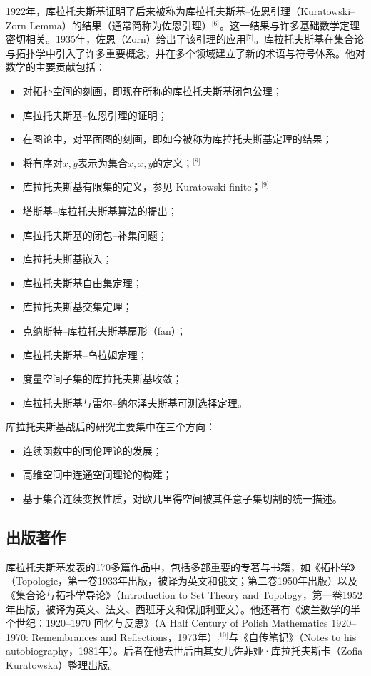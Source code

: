 1922年，库拉托夫斯基证明了后来被称为库拉托夫斯基–佐恩引理（Kuratowski–Zorn Lemma）的结果（通常简称为佐恩引理）\(^\text{[6]}\)。这一结果与许多基础数学定理密切相关。1935年，佐恩（Zorn）给出了该引理的应用\(^\text{[7]}\)。库拉托夫斯基在集合论与拓扑学中引入了许多重要概念，并在多个领域建立了新的术语与符号体系。他对数学的主要贡献包括：
\begin{itemize}
\item 对拓扑空间的刻画，即现在所称的库拉托夫斯基闭包公理；
\item 库拉托夫斯基–佐恩引理的证明；
\item 在图论中，对平面图的刻画，即如今被称为库拉托夫斯基定理的结果；
\item 将有序对$x, y$表示为集合${{x}, {x, y}}$的定义；\(^\text{[8]}\)
\item 库拉托夫斯基有限集的定义，参见 Kuratowski-finite；\(^\text{[9]}\)
\item 塔斯基–库拉托夫斯基算法的提出；
\item 库拉托夫斯基的闭包–补集问题；
\item 库拉托夫斯基嵌入；
\item 库拉托夫斯基自由集定理；
\item 库拉托夫斯基交集定理；
\item 克纳斯特–库拉托夫斯基扇形（fan）；
\item 库拉托夫斯基–乌拉姆定理；
\item 度量空间子集的库拉托夫斯基收敛；
\item 库拉托夫斯基与雷尔–纳尔泽夫斯基可测选择定理。
\end{itemize}
库拉托夫斯基战后的研究主要集中在三个方向：
\begin{itemize}
\item 连续函数中的同伦理论的发展；
\item 高维空间中连通空间理论的构建；
\item 基于集合连续变换性质，对欧几里得空间被其任意子集切割的统一描述。
\end{itemize}
\subsection{出版著作}
库拉托夫斯基发表的170多篇作品中，包括多部重要的专著与书籍，如《拓扑学》（Topologie，第一卷1933年出版，被译为英文和俄文；第二卷1950年出版）以及《集合论与拓扑学导论》（Introduction to Set Theory and Topology，第一卷1952年出版，被译为英文、法文、西班牙文和保加利亚文）。他还著有《波兰数学的半个世纪：1920–1970 回忆与反思》（A Half Century of Polish Mathematics 1920–1970: Remembrances and Reflections，1973年）\(^\text{[10]}\)与《自传笔记》（Notes to his autobiography，1981年）。后者在他去世后由其女儿佐菲娅·库拉托夫斯卡（Zofia Kuratowska）整理出版。

